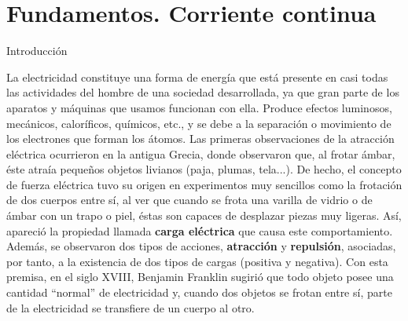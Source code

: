 \documentclass[11pt]{book} %
\makeatletter
\renewcommand{\cleardoublepage}{
\clearpage\ifodd\c@page\else
\hbox{}
\vspace*{\fill}
\thispagestyle{empty}
\newpage
\fi}
\numberwithin{dummy}{section}
\theoremstyle{ocrenumbox}
\theoremstyle{blacknumex}
\theoremstyle{blacknumbox}
\theoremstyle{ocrenum}
\renewcommand{\section}{\@startsection{section}{1}{\z@}
{-4ex \@plus -1ex \@minus -.4ex}
{1ex \@plus.2ex }
{\normalfont\large\sffamily\bfseries}}
\newlength\esp
\newcommand{\thechapterimage}{}%
\newcommand{\chapterimage}[1]{\renewcommand{\thechapterimage}{#1}}%
\makeatother
\begin{document}
	
	
	\chapterimage{indice.jpg} %
	
	\pagestyle{empty} %
	
	\tableofcontents %
	
	
	\pagestyle{fancy} %
	
	
	\chapterimage{imagen_t1.jpg} %
	\chapter{Fundamentos. Corriente continua}\label{chap.cc}
	
	\setcounter{page}{1}
	
	
	\section{Introducción}
	
	La electricidad constituye una forma de energía que está presente en casi todas las actividades del hombre de una sociedad desarrollada, ya que gran parte de los aparatos y máquinas que usamos funcionan con ella. Produce efectos luminosos, mecánicos, caloríficos, químicos, etc., y se debe a la separación o movimiento de los electrones que forman los átomos. Las primeras observaciones de la atracción eléctrica ocurrieron en la antigua Grecia, donde observaron que, al frotar ámbar, éste atraía pequeños objetos livianos (paja, plumas, tela...). De hecho, el concepto de fuerza eléctrica tuvo su origen en experimentos muy sencillos como la frotación de dos cuerpos entre sí, al ver que cuando se frota una varilla de vidrio o de ámbar con un trapo o piel, éstas son capaces de desplazar piezas muy ligeras. Así, apareció la propiedad llamada \textbf{carga eléctrica} que causa este comportamiento. Además, se observaron dos tipos de acciones, \textbf{atracción} y \textbf{repulsión}, asociadas, por tanto, a la existencia de dos tipos de cargas (positiva y negativa). Con esta premisa, en el siglo XVIII, Benjamin Franklin sugirió que todo objeto posee una cantidad ``normal'' de electricidad y, cuando dos objetos se frotan entre sí, parte de la electricidad se transfiere de un cuerpo al otro. 
	
\end{document}
